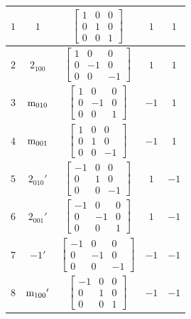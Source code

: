 \documentclass[fleqn,8pt]{jsarticle}
\begin{document}
\begin{longtable}{ccccc}
$ 1 $ & $ 1 $ & $ \begin{bmatrix} 1 & 0 & 0 \\ 0 & 1 & 0 \\ 0 & 0 & 1 \end{bmatrix} $ & $ 1 $ & $ 1 $ \\ \hline
$ 2 $ & $ 2{}_{100} $ & $ \begin{bmatrix} 1 & 0 & 0 \\ 0 & -1 & 0 \\ 0 & 0 & -1 \end{bmatrix} $ & $ 1 $ & $ 1 $ \\ \hline
$ 3 $ & $ {\rm m}_{010} $ & $ \begin{bmatrix} 1 & 0 & 0 \\ 0 & -1 & 0 \\ 0 & 0 & 1 \end{bmatrix} $ & $ -1 $ & $ 1 $ \\ \hline
$ 4 $ & $ {\rm m}_{001} $ & $ \begin{bmatrix} 1 & 0 & 0 \\ 0 & 1 & 0 \\ 0 & 0 & -1 \end{bmatrix} $ & $ -1 $ & $ 1 $ \\ \hline
$ 5 $ & $ 2{}_{010}{}' $ & $ \begin{bmatrix} -1 & 0 & 0 \\ 0 & 1 & 0 \\ 0 & 0 & -1 \end{bmatrix} $ & $ 1 $ & $ -1 $ \\ \hline
$ 6 $ & $ 2{}_{001}{}' $ & $ \begin{bmatrix} -1 & 0 & 0 \\ 0 & -1 & 0 \\ 0 & 0 & 1 \end{bmatrix} $ & $ 1 $ & $ -1 $ \\ \hline
$ 7 $ & $ -1{}' $ & $ \begin{bmatrix} -1 & 0 & 0 \\ 0 & -1 & 0 \\ 0 & 0 & -1 \end{bmatrix} $ & $ -1 $ & $ -1 $ \\ \hline
$ 8 $ & $ {\rm m}_{100}{}' $ & $ \begin{bmatrix} -1 & 0 & 0 \\ 0 & 1 & 0 \\ 0 & 0 & 1 \end{bmatrix} $ & $ -1 $ & $ -1 $ \\
\end{longtable}
\end{document}
